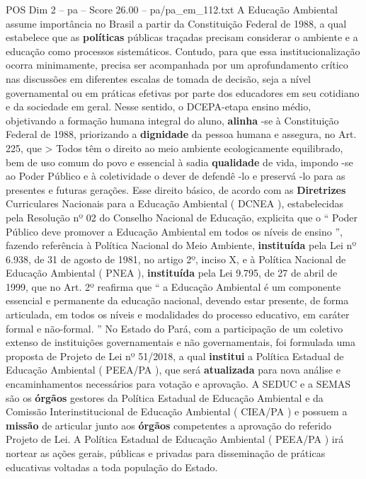 \begin{textsample}{POS Dim 2 – pa – Score 26.00 – pa/pa\_em\_112.txt}
A Educação Ambiental assume importância no Brasil a partir da Constituição Federal de 1988, a qual estabelece que as \textbf{políticas} públicas traçadas precisam considerar o ambiente e a educação como processos sistemáticos.
Contudo, para que essa institucionalização ocorra minimamente, precisa ser acompanhada por um aprofundamento crítico nas discussões em diferentes escalas de tomada de decisão, seja a nível governamental ou em práticas efetivas por parte dos educadores em seu cotidiano e da sociedade em geral.
Nesse sentido, o DCEPA-etapa ensino médio, objetivando a formação humana integral do aluno, \textbf{alinha} -se à Constituição Federal de 1988, priorizando a \textbf{dignidade} da pessoa humana e assegura, no Art. 225, que > Todos têm o direito ao meio ambiente ecologicamente equilibrado, bem de uso comum do povo e essencial à sadia \textbf{qualidade} de vida, impondo -se ao Poder Público e à coletividade o dever de defendê -lo e preservá -lo para as presentes e futuras gerações.
Esse direito básico, de acordo com as \textbf{Diretrizes} Curriculares Nacionais para a Educação Ambiental ( DCNEA ), estabelecidas pela Resolução nº 02 do Conselho Nacional de Educação, explicita que o “ Poder Público deve promover a Educação Ambiental em todos os níveis de ensino ”, fazendo referência à Política Nacional do Meio Ambiente, \textbf{instituída} pela Lei nº 6.938, de 31 de agosto de 1981, no artigo 2º, inciso X, e à Política Nacional de Educação Ambiental ( PNEA ), \textbf{instituída} pela Lei 9.795, de 27 de abril de 1999, que no Art. 2º reafirma que “ a Educação Ambiental é um componente essencial e permanente da educação nacional, devendo estar presente, de forma articulada, em todos os níveis e modalidades do processo educativo, em caráter formal e não-formal. ” No Estado do Pará, com a participação de um coletivo extenso de instituições governamentais e não governamentais, foi formulada uma proposta de Projeto de Lei nº 51/2018, a qual \textbf{institui} a Política Estadual de Educação Ambiental ( PEEA/PA ), que será \textbf{atualizada} para nova análise e encaminhamentos necessários para votação e aprovação.
A SEDUC e a SEMAS são os \textbf{órgãos} gestores da Política Estadual de Educação Ambiental e da Comissão Interinstitucional de Educação Ambiental ( CIEA/PA ) e possuem a \textbf{missão} de articular junto aos \textbf{órgãos} competentes a aprovação do referido Projeto de Lei.
A Política Estadual de Educação Ambiental ( PEEA/PA ) irá nortear as ações gerais, públicas e privadas para disseminação de práticas educativas voltadas a toda população do Estado.

\end{textsample}
